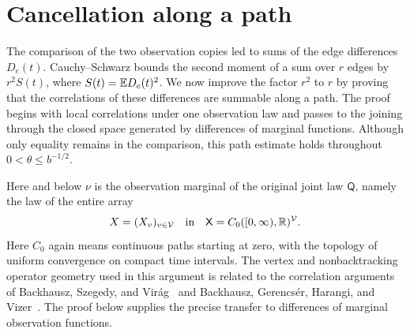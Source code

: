 \section{Cancellation along a path}
\label{sec:spectrum}

The comparison of the two observation copies led to sums of the edge
differences \(D_e(t)\).  Cauchy--Schwarz bounds the second moment of a
sum over \(r\) edges by \(r^2S(t)\), where \(S(t)=\mathbb E D_e(t)^2\).
We now improve the factor \(r^2\) to \(r\) by proving that the
correlations of these differences are summable along a path.
The proof begins with local correlations under one observation law
and passes to the joining through the closed space generated by
differences of marginal functions.  Although only equality remains
in the comparison, this path estimate holds throughout
\(0<\theta\le b^{-1/2}\).

Here and below \(\nu\) is the observation marginal of the original
joint law \(\mathsf Q\), namely the law of the entire array
\[
 X=(X_v)_{v\in\mathcal V}
 \quad\hbox{in}\quad
 \mathsf X=C_0([0,\infty),\mathbb R)^{\mathcal V}.
\]
Here \(C_0\) again means continuous paths starting at zero, with
the topology of uniform convergence on compact time intervals.
The vertex and nonbacktracking operator geometry used in this argument
is related to the correlation arguments of Backhausz, Szegedy, and
Vir\'ag~\cite[Theorem~2.2 in arXiv:1305.6784v1]{BSV}
and Backhausz, Gerencs\'er, Harangi, and
Vizer~\cite[Theorems~4.1--4.2 in arXiv:1603.08423v2]{BGHV}.  The proof below supplies the precise transfer to
differences of marginal observation functions.

